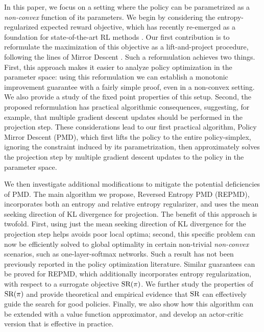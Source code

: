 In this paper, we focus on a setting where the policy can be
parametrized as a \emph{non-convex} function of its parameters.
We begin by considering the entropy-regularized expected reward objective,
which has recently re-emerged as a foundation for state-of-the-art RL methods
\citep{williams1991function,fox2015taming,schulman2017equivalence,nachum2017bridging,haarnoja2017reinforcement}. 
Our first contribution is to reformulate the maximization of 
this objective as a lift-and-project procedure,
following the lines of Mirror Descent
\citep{nemirovskii1983problem,beck2003mirror}.
Such a reformulation achieves two things.
First, this approach makes it easier to analyze policy optimization
in the parameter space:
using this reformulation we can establish a monotonic improvement guarantee
with a fairly simple proof,
even in a non-convex setting.
We also provide a study of the fixed point properties of this setup.
Second, the proposed reformulation has practical algorithmic consequences,
suggesting, for example,
that multiple gradient descent updates should be performed
in the projection step.
These considerations lead to our first practical algorithm,
Policy Mirror Descent (PMD),
which first lifts the policy to the entire policy-simplex,
ignoring the constraint induced by its parametrization,
then approximately solves the projection step by multiple
gradient descent updates to the policy in the parameter space. 
%
%

We then investigate
additional modifications to mitigate the potential deficiencies of PMD.
The main algorithm we propose, Reversed Entropy PMD (REPMD),
incorporates both an entropy and relative entropy regularizer,
and uses the mean seeking direction of KL divergence for projection.
The benefit of this approach is twofold.
First, 
using just the mean seeking direction of KL divergence for the projection step
helps avoids poor local optima;
second,
this specific problem can now be efficiently solved to global optimality
in certain non-trivial \emph{non-convex} scenarios,
such as one-layer-softmax networks.
Such a result has not been previously reported 
in the policy optimization literature.
%
%
Similar guarantees can be proved for REPMD,
which additionally incorporates entropy regularization,
with respect to a surrogate objective $\text{SR}(\pi)$.
We further study the properties of $\text{SR}(\pi)$ and provide theoretical
and empirical evidence that $\text{SR}$ 
can effectively guide the search for good policies.
Finally, we also show how this algorithm can be extended 
with a value function approximator,
and develop an actor-critic version that is effective in practice.




